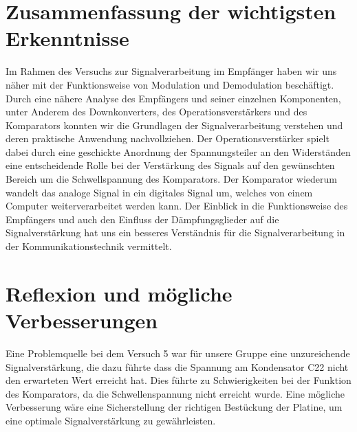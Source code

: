 \section{Zusammenfassung der wichtigsten Erkenntnisse}
Im Rahmen des Versuchs zur Signalverarbeitung im Empfänger haben wir uns näher mit der Funktionsweise von Modulation und Demodulation beschäftigt. Durch eine nähere Analyse des Empfängers und seiner einzelnen Komponenten, unter Anderem des Downkonverters, des Operationsverstärkers und des Komparators
konnten wir die Grundlagen der Signalverarbeitung verstehen und deren praktische Anwendung nachvollziehen. Der Operationsverstärker spielt dabei durch eine geschickte Anordnung der Spannungsteiler an den Widerständen eine entscheidende Rolle bei der Verstärkung des Signals auf den gewünschten Bereich um die Schwellspannung des Komparators. Der Komparator wiederum wandelt das analoge Signal in ein digitales Signal um, welches von einem Computer weiterverarbeitet werden kann.
Der Einblick in die Funktionsweise des Empfängers und auch den Einfluss der Dämpfungsglieder auf die Signalverstärkung hat uns ein besseres Verständnis für die Signalverarbeitung in der Kommunikationstechnik vermittelt.
\section{Reflexion und mögliche Verbesserungen}
Eine Problemquelle bei dem Versuch 5 war für unsere Gruppe eine unzureichende Signalverstärkung, die dazu führte dass die Spannung am Kondensator C22 nicht den erwarteten Wert erreicht hat. Dies führte zu Schwierigkeiten bei der Funktion des Komparators, da die Schwellenspannung nicht erreicht wurde. Eine mögliche Verbesserung wäre eine Sicherstellung der richtigen Bestückung der Platine, um eine optimale Signalverstärkung zu gewährleisten.

\clearpage